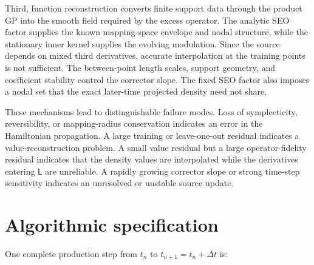 \documentclass[
  11pt,
  letterpaper,
  onehalfspacing,
  normalmargins,
  equalmargins,
  oneside
]{ut-thesis}
\begin{document}
Third, function reconstruction converts finite support data through the product
GP into the smooth field required by
the excess operator. The analytic SEO factor supplies the known mapping-space
envelope and nodal structure, while the stationary inner kernel supplies the
evolving modulation. Since the source depends on mixed third derivatives,
accurate interpolation at the training points is not sufficient. The
between-point length scales, support geometry, and coefficient stability
control the corrector slope. The fixed SEO factor also imposes a nodal set
that the exact later-time projected density need not share.

These mechanisms lead to distinguishable failure modes. Loss of
symplecticity, reversibility, or mapping-radius conservation indicates an
error in the Hamiltonian propagation. A large training or leave-one-out
residual indicates a value-reconstruction problem. A small value residual but
a large operator-fidelity residual indicates that the density values are
interpolated while the derivatives entering \(\mathsf L\) are unreliable. A rapidly
growing corrector slope or strong time-step sensitivity indicates an
unresolved or unstable source update.


\section{Algorithmic specification}
\label{sec:ch5-algorithm}

One complete production step from \(t_n\) to \(t_{n+1}=t_n+\Delta t\) is:
\end{document}
